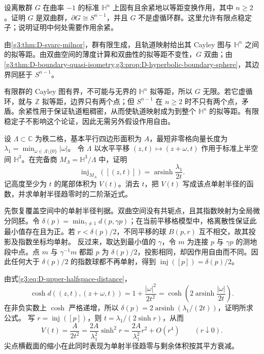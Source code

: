 \begin{exercise}\label{g3:ex:D-hyperbolic-geometric-not-virtually-cyclic}
	设离散群 \(G\) 在曲率 \(-1\) 的标准 \(\mathbb H^n\) 上固有且余紧地以等距变换作用，其中 \(n\ge2\)。证明 \(G\) 是双曲群，\(\partial G\cong S^{n-1}\)，并且 \(G\) 不是虚循环群。这里允许有限点稳定子；说明证明中何处需要作用余紧。
\end{exercise}
\begin{solution}
	由\cref{g3:thm:D-svarc-milnor}，群有限生成，且轨道映射给出其 Cayley 图与 \(\mathbb H^n\) 之间的拟等距。由双曲空间的薄度计算和双曲性的拟等距不变性，\(G\) 双曲；由\cref{g3:thm:D-boundary-quasi-isometry,g3:prop:D-hyperbolic-boundary-sphere}，其边界同胚于 \(S^{n-1}\)。

	有限群的 Cayley 图有界，不可能与无界的 \(\mathbb H^n\) 拟等距，所以 \(G\) 无限。若它虚循环，就与 \(\mathbb Z\) 拟等距，边界只有两个点；但 \(S^{n-1}\) 在 \(n\ge2\) 时不只有两个点，矛盾。余紧性用于保证轨道粗稠密，从而使轨道映射成为到整个 \(\mathbb H^n\) 的拟等距。有限稳定子不影响这个论证，因此无需另外假设作用自由。
\end{solution}

\begin{exercise}\label{g3:ex:D-cusp-injectivity-volume}
	设 \(\Lambda\subset\mathbb C\) 为秩二格，基本平行四边形面积为 \(A\)，最短非零格向量长度为
	\(\lambda_1=\min_{\omega\in\Lambda\setminus\{0\}}|\omega|\)。
	令 \(\Lambda\) 以水平平移 \((z,t)\mapsto(z+\omega,t)\) 作用于标准上半空间 \(\mathbb H^3\)。在完备商 \(M_\Lambda=\mathbb H^3/\Lambda\) 中，证明
	\[
		\operatorname{inj}_{M_\Lambda}([(z,t)])
		     =\operatorname{arsinh}\frac{\lambda_1}{2t}.
	\]
	记高度至少为 \(t\) 的尾部体积为 \(V(t)\)。消去 \(t\)，把 \(V(t)\) 写成该点单射半径的函数，并求单射半径趋零时的二阶渐近式。
\end{exercise}
\begin{solution}
	先恢复覆盖空间中的单射半径判据。双曲空间没有共轭点，且其指数映射为全局微分同胚。令
	\(\delta(p)=\min_{\gamma\ne1}d(p,\gamma p)\)；在当前平移格模型中，格离散性保证此最小值存在且为正。若 \(r<\delta(p)/2\)，不同平移的球
	\(B(p,r)\) 互不相交，故其投影及指数坐标均单射。
	反过来，取达到最小值的 \(\gamma\)，令 \(m\) 为连接 \(p\) 与
	\(\gamma p\) 的测地段中点。点 \(m\) 与 \(\gamma^{-1}m\) 都距 \(p\)
	为 \(\delta(p)/2\)，投影相同，却因作用自由而不同。因此任何大于
	\(\delta(p)/2\) 的指数球都不再单射，得到
	\(\operatorname{inj}([p])=\delta(p)/2\)。

	由式\eqref{g3:eq:D-upper-halfspace-distance}，
	\[
		\cosh d((z,t),(z+\omega,t))
		    =1+\frac{|\omega|^2}{2t^2}
		    =\cosh\left(2\operatorname{arsinh}\frac{|\omega|}{2t}\right).
	\]
	在非负实数上 \(\cosh\) 严格递增，所以
	\(\delta(p)=2\operatorname{arsinh}(\lambda_1/(2t))\)，证明所求公式。
	写 \(r=\operatorname{inj}([p])\)，则
	\(t=\lambda_1/(2\sinh r)\)，从而
	\[
		V(t)=\frac{A}{2t^2}
		     =\frac{2A}{\lambda_1^2}\sinh^2r
		     =\frac{2A}{\lambda_1^2}r^2+O(r^4)
		     \qquad(r\downarrow0).
	\]
	尖点横截面的缩小在此同时表现为单射半径趋零与剩余体积按其平方衰减。
\end{solution}

